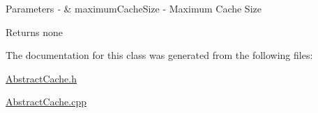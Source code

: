 \begin{DoxyParams}{\-Parameters}
{\em -\/} & maximum\-Cache\-Size -\/ \-Maximum \-Cache \-Size \\
\hline
\end{DoxyParams}
\begin{DoxyReturn}{\-Returns}
none 
\end{DoxyReturn}


\-The documentation for this class was generated from the following files\-:\begin{DoxyCompactItemize}
\item 
\hyperlink{AbstractCache_8h}{\-Abstract\-Cache.\-h}\item 
\hyperlink{AbstractCache_8cpp}{\-Abstract\-Cache.\-cpp}\end{DoxyCompactItemize}
